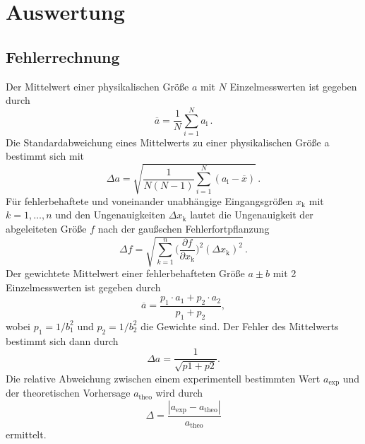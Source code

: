 \section{Auswertung}
\label{sec:Auswertung}
\subsection{Fehlerrechnung}
Der Mittelwert einer physikalischen Größe $a$ mit $N$ Einzelmesswerten ist gegeben durch
\begin{equation}\label{eq:mean}
    \overline{a}=\frac{1}{N}\sum_{i=1}^Na_\text{i}\,.
\end{equation}
Die Standardabweichung eines Mittelwerts zu einer physikalischen Größe a bestimmt sich mit
\begin{equation}\label{eq:std}
    \Delta{a}=\sqrt{\frac{1}{N(N-1)}\sum_{i=1}^N\left(a_\text{i}-\overline{x}\right)}\,.
\end{equation}
Für fehlerbehaftete und voneinander unabhängige Eingangsgrößen $x_\text{k}$ mit {${k=1\text{,}\,\ldots\text{,}\,n}$} und den Ungenauigkeiten $\Delta x_\text{k}$ lautet die Ungenauigkeit der abgeleiteten Größe $f$ nach der gaußschen Fehlerfortpflanzung
\begin{equation}\label{eq:gauss}
    \Delta f=\sqrt{\sum_{k=1}^{n}\biggl(\frac{\partial f}{\partial x_\text{k}}\biggr)^2(\Delta x_\text{k})^2}\,.
\end{equation}
Der gewichtete Mittelwert einer fehlerbehafteten Größe $a\pm b$ mit 2 Einzelmesswerten ist gegeben durch
\begin{equation}\label{eq:gmean}
    \overline{a}=\frac{p_1\cdot a_1+p_2\cdot a_2}{p_1+p_2},
\end{equation}
wobei $p_1=1/b_1^2$ und $p_2=1/b_2^2$ die Gewichte sind.
Der Fehler des Mittelwerts bestimmt sich dann durch 
\begin{equation}\label{eq:gstd}
    \Delta a= \frac{1}{\sqrt{p1+p2}}.
\end{equation}
Die relative Abweichung zwischen einem experimentell bestimmten Wert $a_\text{exp}$ und der theoretischen Vorhersage $a_\text{theo}$ wird 
durch 
\begin{equation}\label{eq:delta}
    \Delta = \frac{|a_\text{exp}-a_\text{theo}|}{a_\text{theo}}
\end{equation}
ermittelt.
